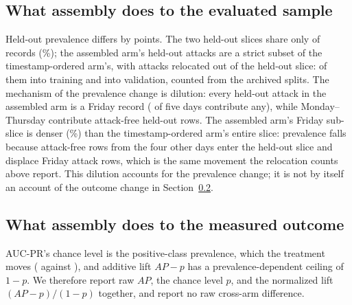\documentclass[manuscript,anonymous,review]{acmart}
\begin{document}
\subsection{What assembly does to the evaluated sample}
Held-out prevalence differs by \SFourCicidsPrevShiftAbsPp{} points. The two
held-out slices share only \CicidsHeldoutOverlap{} of \CicidsHeldoutSize{}
records (\CicidsHeldoutOverlapPct\%); the assembled arm's held-out attacks are
a strict subset of the timestamp-ordered arm's, with
\CicidsAttacksMovedOutOfHeldout{} attacks relocated out of the held-out slice:
\RefRelocatedToTraining{} of them into training and \RefRelocatedToValidation{}
into validation, counted from the archived splits. The
mechanism of the prevalence change is dilution: every held-out attack in the
assembled arm is a Friday record
(\CicidsSyntheticHeldoutAttackDays{} of five days contribute any), while
Monday--Thursday contribute \CicidsHeldoutAttackFreeRows{} attack-free held-out
rows. The assembled arm's Friday sub-slice is denser
(\CicidsFridayHeldoutDensityPct\%) than the timestamp-ordered arm's entire
slice: prevalence falls because attack-free rows from the four other days enter
the held-out slice and displace Friday attack rows, which is the same movement
the relocation counts above report. This dilution accounts for the prevalence change; it
is not by itself an account of the outcome change in
Section~\ref{sec:outcome}.

\begin{table}
\caption{The assembly contrast. Held-out prevalence, attacks, and the evaluated
detector's AUC-PR per arm. Every cell is a macro resolving to an archived
manifest.}
\label{tab:contrast}

\end{table}

\subsection{What assembly does to the measured outcome}
\label{sec:outcome}
AUC-PR's chance level is the positive-class prevalence, which the treatment
moves (\SFourCicidsNaturalChanceFloor{} against
\SFourCicidsSyntheticChanceFloor), and additive lift $AP-p$ has a
prevalence-dependent ceiling of $1-p$. We therefore report raw $AP$, the chance
level $p$, and the normalized lift $(AP-p)/(1-p)$ together, and report no raw
cross-arm difference.
\end{document}
